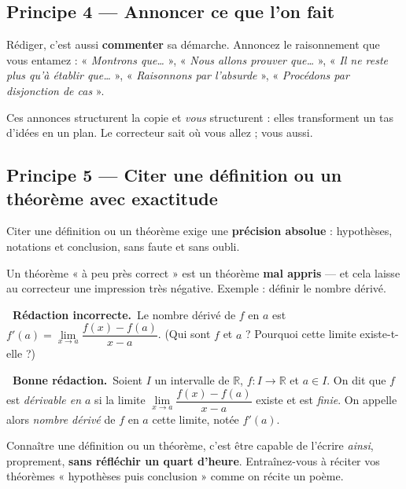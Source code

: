 \documentclass[11pt,a4paper]{article}
\newcommand{\ok}{\textcolor{METeal}{\textbf{\ding{51}\ \sffamily Bonne rédaction.}}\ }
\newcommand{\ko}{\textcolor{MECoral}{\textbf{\ding{55}\ \sffamily Rédaction incorrecte.}}\ }
\newcommand{\R}{\mathbb{R}}
\newcommand{\ra}{\longrightarrow}
\begin{document}
\subsection{Principe 4 — Annoncer ce que l'on fait}

Rédiger, c'est aussi \textbf{commenter} sa démarche. Annoncez le raisonnement que vous
entamez : « \emph{Montrons que\dots} », « \emph{Nous allons prouver que\dots} »,
« \emph{Il ne reste plus qu'à établir que\dots} », « \emph{Raisonnons par l'absurde} »,
« \emph{Procédons par disjonction de cas} ».

\begin{astuce}
Ces annonces structurent la copie et \emph{vous} structurent : elles transforment un tas
d'idées en un plan. Le correcteur sait où vous allez ; vous aussi.
\end{astuce}

\subsection{Principe 5 — Citer une définition ou un théorème avec exactitude}

\begin{regle}
Citer une définition ou un théorème exige une \textbf{précision absolue} : hypothèses,
notations et conclusion, sans faute et sans oubli.
\end{regle}

Un théorème « à peu près correct » est un théorème \textbf{mal appris} — et cela laisse au
correcteur une impression très négative. Exemple : définir le nombre dérivé.
\begin{mauvaise}
\ko Le nombre dérivé de $f$ en $a$ est $f'(a)=\lim\limits_{x\to a}\dfrac{f(x)-f(a)}{x-a}$.
\quad(Qui sont $f$ et $a$ ? Pourquoi cette limite existe-t-elle ?)
\end{mauvaise}
\begin{bonne}
\ok Soient $I$ un intervalle de $\R$, $f:I\ra\R$ et $a\in I$. On dit que $f$ est
\emph{dérivable en $a$} si la limite $\lim\limits_{x\to a}\dfrac{f(x)-f(a)}{x-a}$ existe et est
\emph{finie}. On appelle alors \emph{nombre dérivé} de $f$ en $a$ cette limite, notée $f'(a)$.
\end{bonne}

\begin{astuce}
Connaître une définition ou un théorème, c'est être capable de l'écrire \emph{ainsi},
proprement, \textbf{sans réfléchir un quart d'heure}. Entraînez-vous à réciter vos théorèmes
« hypothèses puis conclusion » comme on récite un poème.
\end{astuce}
\end{document}
